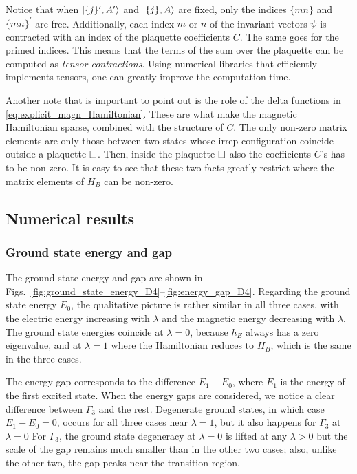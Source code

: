 Notice that when $\ket{ \{j\}^{\prime}, A^{\prime}}$ and $\ket{ \{j\}, A}$ are fixed, only the indices $ \{mn\} $ and $ \{mn\}^{\prime}$ are free.
Additionally, each index $m$ or $n$ of the invariant vectors $\psi$ is contracted with an index of the plaquette coefficients $C$.
The same goes for the primed indices.
This means that the terms of the sum over the plaquette can be computed as \emph{tensor contractions}.
Using numerical libraries that efficiently implements tensors, one can greatly improve the computation time.

Another note that is important to point out is the role of the delta functions in \eqref{eq:explicit_magn_Hamiltonian}.
These are what make the magnetic Hamiltonian sparse, combined with the structure of $C$.
The only non-zero matrix elements are only those between two states whose \ac{irrep} configuration coincide outside a plaquette $\square$.
Then, inside the plaquette $\square$ also the coefficients $C$'s has to be non-zero.
It is easy to see that these two facts greatly restrict where the matrix elements of $H_B$ can be non-zero.



\newpage

\subsection{Numerical results}
\label{sub:numerical_results_D4}

\subsubsection*{Ground state energy and gap}

The ground state energy and gap are shown in Figs.~\ref{fig:ground_state_energy_D4}--\ref{fig:energy_gap_D4}.
Regarding the ground state energy $E_0$, the qualitative picture is rather similar in all three cases, with the electric energy increasing with $\lambda$ and the magnetic energy decreasing with $\lambda$.
The ground state energies coincide at $\lambda = 0$, because $h_E$ always has a zero eigenvalue, and at $\lambda=1$ where the Hamiltonian reduces to $H_B$, which is the same in the three cases.

The energy gap corresponds to the difference $E_1 - E_0$, where $E_1$ is the energy of the first excited state.
When the energy gaps are considered, we notice a clear difference between $\Gamma_3$ and the rest.
Degenerate ground states, in which case $E_1-E_0=0$, occurs for all three cases near $\lambda=1$, but it also happens for $\Gamma_3$ at $\lambda=0$
For $\Gamma_3$, the ground state degeneracy at $\lambda=0$ is lifted at any $\lambda > 0$ but the scale of the gap remains much smaller than in the other two cases; also, unlike the other two, the gap peaks near the transition region.


